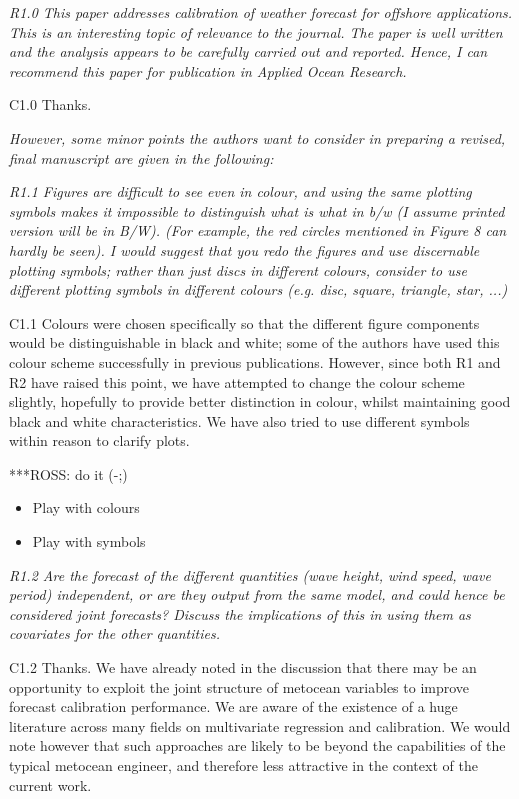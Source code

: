 \documentclass[a4paper,10pt]{article}
\begin{document}
	\emph{R1.0 This paper addresses calibration of weather forecast for offshore applications. This is an interesting topic of relevance to the journal. The paper is well written and the analysis appears to be carefully carried out and reported. Hence, I can recommend this paper for publication in Applied Ocean Research.}
	
	C1.0 Thanks.

	\emph{However, some minor points the authors want to consider in preparing a revised, final manuscript are given in the following:}
	
	\emph{R1.1 Figures are difficult to see even in colour, and using the same plotting symbols makes it impossible to distinguish what is what in b/w (I assume printed version will be in B/W). (For example, the red circles mentioned in Figure 8 can hardly be seen). I would suggest that you redo the figures and use discernable plotting symbols; rather than just discs in different colours, consider to use different plotting symbols in different colours (e.g. disc, square, triangle, star, ...)}
		
	C1.1 Colours were chosen specifically so that the different figure components would be distinguishable in black and white; some of the authors have used this colour scheme successfully in previous publications. However, since both R1 and R2 have raised this point, we have attempted to change the colour scheme slightly, hopefully to provide better distinction in colour, whilst maintaining good black and white characteristics. We have also tried to use different symbols within reason to clarify plots.
	
	***ROSS: do it (-;)
	\begin{itemize}
		\item Play with colours
		\item Play with symbols
	\end{itemize}
	
	\emph{R1.2 Are the forecast of the different quantities (wave height, wind speed, wave period) independent, or are they output from the same model, and could hence be considered joint forecasts? Discuss the implications of this in using them as covariates for the other quantities.}
	
	C1.2 Thanks. We have already noted in the discussion that there may be an opportunity to exploit the joint structure of metocean variables to improve forecast calibration performance. We are aware of the existence of a huge literature across many fields on multivariate regression and calibration. We would note however that such approaches are likely to be beyond the capabilities of the typical metocean engineer, and therefore less attractive in the context of the current work.
	
\end{document}
